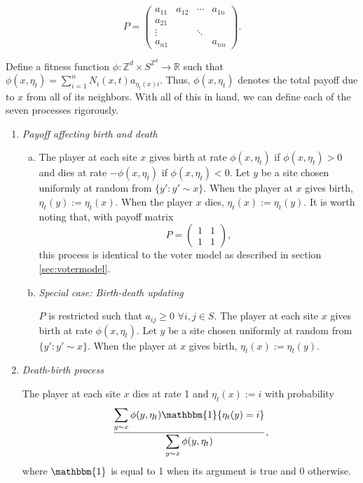 \documentclass[notitlepage,reqno]{amsart}
\begin{document}
\[
    P = 
    \begin{pmatrix}
      a_{11} & a_{12} & \cdots & a_{1n} \\
      a_{21} & & & \\
      \vdots & & \ddots & \\
      a_{n1} & & & a_{nn}
    \end{pmatrix}.
\]

Define a fitness function
$\phi:\mathbb{Z}^d\times S^{\mathbb{Z}^d} \to \mathbb{R}$ such that
$\phi(x,\eta_t) = \sum_{i=1}^n N_i(x,t)a_{\eta_t(x)i}$. Thus,
$\phi(x,\eta_t)$ denotes the total payoff due to $x$ from all of its
neighbors. With all of this in hand, we can define each of the seven processes rigorously.

\begin{enumerate}[(1)]
\item \emph{Payoff affecting birth and death}

\begin{enumerate}[(a)]
\item \label{itm:1} The player at each site $x$ gives birth at rate $\phi(x,\eta_t)$ if
$\phi(x,\eta_t) > 0$ and dies at rate $-\phi(x,\eta_t)$ if $\phi(x,\eta_t) <
0$. Let $y$ be a site chosen uniformly at random from $\{y':y'\sim
x\}$. When the player at $x$ gives birth, $\eta_t(y) :=
\eta_t(x)$. When the player $x$ dies, $\eta_t(x) := \eta_t(y)$. It is
worth noting that, with payoff matrix
\[
    P = \begin{pmatrix}
      1 & 1 \\
      1 & 1
\end{pmatrix},
\]
this process is identical to the voter model as described in section \ref{sec:votermodel}.

\item \label{itm:2} \emph{Special case: Birth-death updating}

$P$ is restricted such that $a_{ij} \geq 0$ $\forall i,j\in S$. The player at each site $x$ gives birth at rate $\phi(x,\eta_t)$. Let $y$ be a site chosen uniformly at random from $\{y':y'\sim x\}$. When the player at $x$ gives birth, $\eta_t(x) := \eta_t(y)$.
\end{enumerate}

\item \label{itm:3} \emph{Death-birth process}

The player at each site $x$ dies at rate 1 and $\eta_t(x) := i$ with probability
\[
    \frac{\displaystyle\sum_{y\sim x} \phi(y,\eta_t)\mathbbm{1}\{\eta_t(y) = i\}}{\displaystyle\sum_{y\sim x}\phi(y,\eta_t)},
\]
where $\mathbbm{1}$ is equal to 1 when its argument is true and 0 otherwise.


\end{enumerate}
\end{document}
